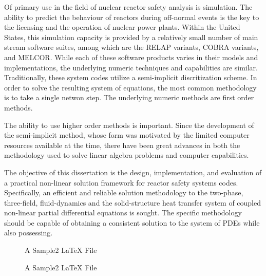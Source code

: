 
Of primary use in the field of nuclear reactor safety analysis is simulation.
The ability to predict the behaviour of reactors during off-normal events is the key to the licensing and the operation of nuclear power plants.
Within the United States, this simulation capacity is provided by a relatively small number of main stream software suites, among which are the RELAP variants, COBRA variants, and MELCOR.
While each of these software products varies in their models and implementations, the underlying numeric techniques and capabilities are similar.
Traditionally, these system codes utilize a semi-implicit discritization scheme.
In order to solve the resulting system of equations, the most common methodology is to take a single netwon step. 
The underlying numeric methods are first order methods.

The ability to use higher order methods is important.
Since the development of the semi-implicit method, whose form was motivated by the limited computer resources available at the time, there have been great advances in both the methodology used to solve linear algebra problems and computer capabilities.

The objective of this dissertation is the design, implementation, and evaluation of a practical non-linear solution framework for reactor safety systems codes.
Specifically, an efficient and reliable solution methodology to the two-phase, three-field, fluid-dynamics and the solid-structure heat transfer system of coupled non-linear partial differential equations is sought.
The specific methodology should be capable of obtaining a consistent solution to the system of PDEs while also possessing.

\begin{figure} %
{\singlespace\tt\footnotesize}\caption{A Sample2 \LaTeX{} File}
\label{intro:sample1}
\end{figure}


\begin{figure} %
{\singlespace\tt\footnotesize}\caption{A Sample2 \LaTeX{} File}
\label{intro:sample2}
\end{figure}